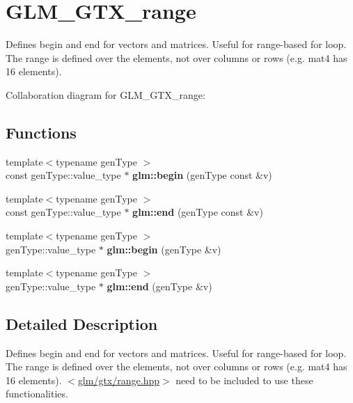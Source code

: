 \hypertarget{group__gtx__range}{\section{G\-L\-M\-\_\-\-G\-T\-X\-\_\-range}
\label{group__gtx__range}
}


Defines begin and end for vectors and matrices. Useful for range-\/based for loop. The range is defined over the elements, not over columns or rows (e.\-g. mat4 has 16 elements).  


Collaboration diagram for G\-L\-M\-\_\-\-G\-T\-X\-\_\-range\-:
\subsection*{Functions}
\begin{DoxyCompactItemize}
\item 
\hypertarget{group__gtx__range_ga774c16a37371658a2a1540faf9122839}{{\footnotesize template$<$typename gen\-Type $>$ }\\const gen\-Type\-::value\-\_\-type $\ast$ {\bfseries glm\-::begin} (gen\-Type const \&v)}\label{group__gtx__range_ga774c16a37371658a2a1540faf9122839}

\item 
\hypertarget{group__gtx__range_ga97ffec4ea7e07302f11befff9cb37acd}{{\footnotesize template$<$typename gen\-Type $>$ }\\const gen\-Type\-::value\-\_\-type $\ast$ {\bfseries glm\-::end} (gen\-Type const \&v)}\label{group__gtx__range_ga97ffec4ea7e07302f11befff9cb37acd}

\item 
\hypertarget{group__gtx__range_gacc3851df89b9238430e39525c3518ced}{{\footnotesize template$<$typename gen\-Type $>$ }\\gen\-Type\-::value\-\_\-type $\ast$ {\bfseries glm\-::begin} (gen\-Type \&v)}\label{group__gtx__range_gacc3851df89b9238430e39525c3518ced}

\item 
\hypertarget{group__gtx__range_ga0c303e8c522b139252646a93d5e490d4}{{\footnotesize template$<$typename gen\-Type $>$ }\\gen\-Type\-::value\-\_\-type $\ast$ {\bfseries glm\-::end} (gen\-Type \&v)}\label{group__gtx__range_ga0c303e8c522b139252646a93d5e490d4}

\end{DoxyCompactItemize}


\subsection{Detailed Description}
Defines begin and end for vectors and matrices. Useful for range-\/based for loop. The range is defined over the elements, not over columns or rows (e.\-g. mat4 has 16 elements). $<$\hyperlink{range_8hpp}{glm/gtx/range.\-hpp}$>$ need to be included to use these functionalities. 